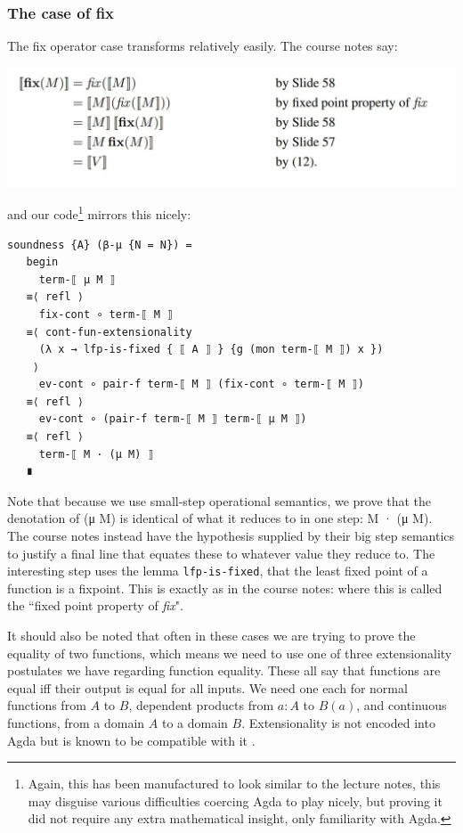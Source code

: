 \documentclass[12pt,a4paper,twoside,openright]{report}
\begin{document}
\subsubsection{The case of fix}
The fix operator case transforms relatively easily. The course notes say:
\begin{center}
\includegraphics[scale = 0.7]{figs/fix_soundness}
\end{center}
and our code\footnote{Again, this has been manufactured to look similar to the lecture notes, this may disguise various difficulties coercing Agda to play nicely, but proving it did not require any extra mathematical insight, only familiarity with Agda.} mirrors this nicely:
\begin{verbatim}
soundness {A} (β-μ {N = N}) =
   begin
     term-⟦ μ M ⟧
   ≡⟨ refl ⟩
     fix-cont ∘ term-⟦ M ⟧
   ≡⟨ cont-fun-extensionality
     (λ x → lfp-is-fixed { ⟦ A ⟧ } {g (mon term-⟦ M ⟧) x })
    ⟩
     ev-cont ∘ pair-f term-⟦ M ⟧ (fix-cont ∘ term-⟦ M ⟧)
   ≡⟨ refl ⟩
     ev-cont ∘ (pair-f term-⟦ M ⟧ term-⟦ μ M ⟧)
   ≡⟨ refl ⟩
     term-⟦ M · (μ M) ⟧
   ∎
\end{verbatim}
Note that because we use small-step operational semantics, we prove that the denotation of (μ M) is identical of what it reduces to in one step: M · (μ M). The course notes instead have the hypothesis supplied by their big step semantics to justify a final line that equates these to whatever value they reduce to. The interesting step uses the lemma \texttt{lfp-is-fixed}, that the least fixed point of a function is a fixpoint. This is exactly as in the course notes: where this is called the ``fixed point property of \textit{fix}". 

It should also be noted that often in these cases we are trying to prove the equality of two functions, which means we need to use one of three extensionality postulates we have regarding function equality. These all say that functions are equal iff their output is equal for all inputs. We need one each for normal functions from $A$ to $B$, dependent products from $a : A$ to $B(a)$, and continuous functions, from a domain $A$ to a domain $B$. Extensionality is not encoded into Agda but is known to be compatible with it \cite{PLFA}.
\end{document}
